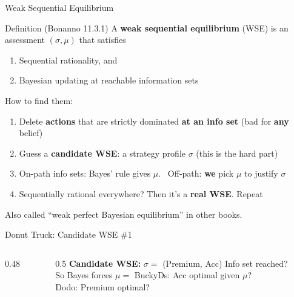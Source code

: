 \begin{frame}{Weak Sequential Equilibrium}
\begin{block}{Definition (Bonanno 11.3.1)}
A \textbf{weak sequential equilibrium} (WSE) is an assessment $(\sigma,\mu)$ that satisfies
\begin{enumerate}
    \item Sequential rationality, and
    \item Bayesian updating at reachable information sets
\end{enumerate}
\end{block}
\bsk
How to find them:
\begin{enumerate}
    \item Delete \textbf{actions} that are strictly dominated \textbf{at an info set} (bad for \textbf{any} belief)
    \item Guess a \textbf{candidate WSE}: a strategy profile $\sigma$ (this is the hard part)
    \item On-path info sets: Bayes' rule gives $\mu$. \ Off-path: \textbf{we} pick $\mu$ to justify $\sigma$
    \item Sequentially rational everywhere? Then it's a \textbf{real WSE}. Repeat
\end{enumerate}
\vfill
{\footnotesize Also called ``weak perfect Bayesian equilibrium'' in other books.}
\vspace{-0.2in}
\end{frame}

\begin{frame}{Donut Truck: Candidate WSE \#1}
\begin{columns}[c]
\begin{column}{0.48\textwidth}
\centering
\donuttree[0.78]{}
\end{column}
\begin{column}{0.5\textwidth}
\textbf{Candidate WSE:} $\sigma=$ (Premium, Acc)
\bsk
Info set reached?  \\[4pt]
So Bayes forces $\mu=$ 
\bsk
BuckyDs: Acc optimal given $\mu$? \\[4pt]
Dodo: Premium optimal? 
\end{column}
\end{columns}
\bsk
{}
\vspace{-0.3in}
\end{frame}

